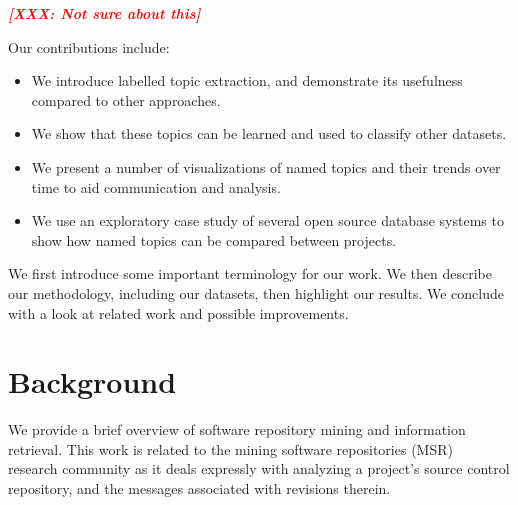 \documentclass{acm_proc_article-sp}
\newcommand{\XXX}[1]{\textcolor{red}{{\it \textbf{[XXX: #1]}}}}
\begin{document}
\XXX{Not sure about this}
\begin{comment}
Typically what is distinct is the software's particular functionality -- whether it offers email composition, prepares tax returns, and so on. What is common, however, is the non-functional, or quality requirements, that the software focuses on. Our approach makes use of software quality taxonomies in order to compare different projects on similar concepts. For example, how is the Security quality treated over time by product A versus product B? Does product A care about it more as it matures? Does the quality occur more often in software commits?
\end{comment}

Our contributions include:
\begin{itemize}
\item  We introduce labelled topic extraction, and demonstrate its usefulness
  compared to other approaches.
\item We show that these topics can be learned and used to classify other datasets.
\item We present a number of visualizations of named topics and their trends over time to aid
  communication and analysis.
\item We use an exploratory case study of
  several open source database systems to show how named topics can be compared between projects.
\end{itemize}

We first introduce some important terminology for our work. We then describe our methodology, including our datasets, then highlight our results. We conclude with a look at related work and possible improvements.

\section{Background}

We provide a brief overview of software repository mining and information retrieval.
This work is related to the mining software repositories (MSR)~\cite{msr} research community as it deals expressly with analyzing a project's source control repository, and the messages associated with revisions therein.
\end{document}
